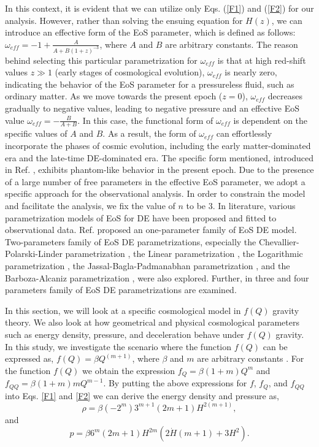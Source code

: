 \documentclass[prd,superscriptaddress,amsfonts,amssymb,amsmath,showpacs,twocolumn]{revtex4-2}
\begin{document}
In this context, it is evident that we can utilize only Eqs. (\ref{F1}) and (\ref{F2}) for
our analysis. However, rather than solving the ensuing equation for $H(z)$,
we can introduce an effective form of the EoS parameter, which is defined as
follows: $\omega _{eff}=-1+\frac{A}{A+B\left( 1+z\right) ^{-3}}$, where $A$
and $B$ are arbitrary constants. The reason behind selecting this particular
parametrization for $\omega _{eff}$ is that at high red-shift values $z\gg 1$
(early stages of cosmological evolution), $\omega _{eff}$ is nearly zero,
indicating the behavior of the EoS parameter for a pressureless fluid, such
as ordinary matter. As we move towards the present epoch ($z=0$), $\omega
_{eff}$ decreases gradually to negative values, leading to negative pressure
and an effective EoS value $\omega _{eff}=-\frac{B}{A+B}$. In this case, the
functional form of $\omega _{eff}$ is dependent on the specific values of $A$
and $B$. As a result, the form of $\omega _{eff}$ can effortlessly
incorporate the phases of cosmic evolution, including the early
matter-dominated era and the late-time DE-dominated era. The specific form mentioned, introduced in Ref. \cite{P0}, exhibits phantom-like behavior in the present epoch. Due to the presence of a large number of free parameters in the effective EoS parameter, we adopt a specific approach for the observational analysis. In order to constrain the model and facilitate the analysis, we fix the value of $n$ to be $3$. In literature, various
parametrization models of EoS for DE have been proposed and fitted to
observational data. Ref. \cite{P1} proposed an one-parameter family of EoS
DE model. Two-parameters family of EoS DE parametrizations, especially the
Chevallier-Polarski-Linder parametrization \cite{P2, P3}, the Linear
parametrization \cite{P3, P4, P5, P6}, the Logarithmic parametrization \cite%
{P7}, the Jassal-Bagla-Padmanabhan parametrization \cite{P8}, and the
Barboza-Alcaniz parametrization \cite{P9}, were also explored. Further, in 
\cite{P10, P11, P12} three and four parameters family of EoS DE
parametrizations are examined.

In this section, we will look at a specific cosmological model in $f(Q)$
gravity theory. We also look at how geometrical and physical cosmological
parameters such as energy density, pressure, and deceleration behave under $%
f(Q) $ gravity. In this study, we investigate the scenario where the
function $f(Q)$ can be expressed as, $f(Q)=\beta Q^{\left( m+1\right) }$,
where $\beta$ and $m$ are arbitrary constants \cite{Q4,PW1,PW2}. For the function $f(Q)$ we
obtain the expression $f_{Q}=\beta \left( 1+m\right) Q^{m}$ and $%
f_{QQ}=\beta \left( 1+m\right) mQ^{m-1}$. By putting the above expressions
for $f$, $f_{Q}$, and $f_{QQ}$ into Eqs. \eqref{F1} and \eqref{F2} we can
derive the energy density and pressure as, 
\begin{equation}
\rho =\beta \left( -2^{m}\right) 3^{m+1}(2m+1)H^{2(m+1)},
\label{rhoM}
\end{equation}%
and%
\begin{equation}
p=\beta 6^{m}(2m+1)H^{2m}\left( 2\dot{H}(m+1)+3H^{2}\right)
.
\end{equation}
\end{document}
